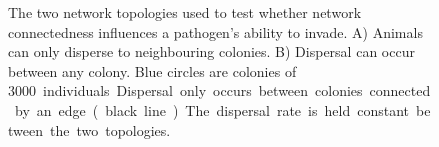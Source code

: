 \begin{figure}[t]
{\centering 
{}
}
\caption[Network topologies used to compare network connectedness]{
The two network topologies used to test whether network connectedness influences a pathogen's ability to invade.
A) Animals can only disperse to neighbouring colonies. 
B) Dispersal can occur between any colony.
Blue circles are colonies of \SI{3000} individuals.
Dispersal only occurs between colonies connected by an edge (black line).
The dispersal rate is held constant between the two topologies.
}
\label{f:net}
\end{figure}























